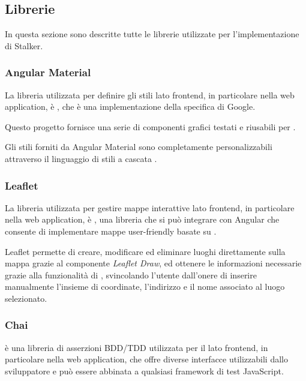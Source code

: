 \documentclass[../../../manuale-manutentore.tex]{subfiles}
\begin{document}
\subsection{Librerie}%
\label{sub:librerie}
In questa sezione sono descritte tutte le librerie utilizzate per l'implementazione di Stalker.


\subsubsection{Angular Material}%
\label{subs:angular_material}

La libreria utilizzata per definire gli stili lato frontend, in particolare nella web application, è , che è una implementazione della specifica  di Google.

Questo progetto fornisce una serie di componenti grafici testati e riusabili per \@.

Gli stili forniti da Angular Material sono completamente personalizzabili attraverso il linguaggio di stili a cascata .

\subsubsection{Leaflet}%
\label{subs:leaflet}

La libreria utilizzata per gestire mappe interattive lato frontend, in particolare nella web application, è , una libreria che si può integrare con Angular che consente di implementare mappe user-friendly basate su .

Leaflet permette di creare, modificare ed eliminare luoghi direttamente sulla mappa grazie al componente \textit{Leaflet Draw}, ed ottenere le informazioni necessarie grazie alla funzionalità di , svincolando l'utente dall'onere di inserire manualmente l'insieme di coordinate, l'indirizzo e il nome associato al luogo selezionato.

\subsubsection{Chai}%
\label{subs:chai}

 è una libreria di asserzioni BDD/TDD utilizzata per il lato frontend, in particolare nella web application, che offre diverse interfacce utilizzabili dallo sviluppatore e può essere abbinata a qualsiasi framework di test JavaScript.
\end{document}
